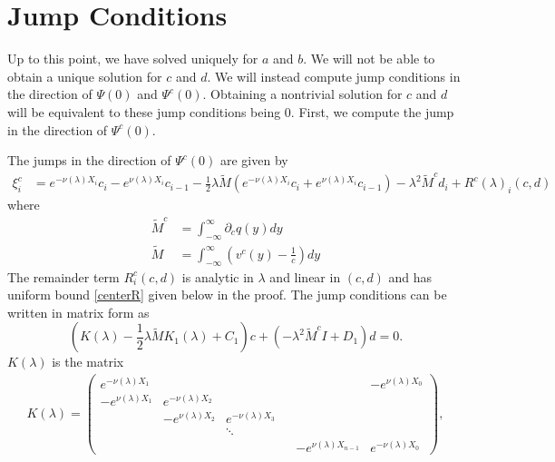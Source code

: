 \documentclass[thesis.tex]{subfiles}
\begin{document}
\section{Jump Conditions}

Up to this point, we have solved uniquely for $a$ and $b$. We will not be able to obtain a unique solution for $c$ and $d$. We will instead compute jump conditions in the direction of $\Psi(0)$ and $\Psi^c(0)$. Obtaining a nontrivial solution for $c$ and $d$ will be equivalent to these jump conditions being 0. First, we compute the jump in the direction of $\Psi^c(0)$. 

\begin{lemma}\label{jumpcenteradj}
The jumps in the direction of $\Psi^c(0)$ are given by
\begin{equation}\label{xic}
\begin{aligned}
\xi^c_i &= e^{-\nu(\lambda)X_i} c_i - e^{\nu(\lambda)X_i} c_{i-1} - \frac{1}{2}\lambda \tilde{M} \left( e^{-\nu(\lambda)X_i}c_i + e^{\nu(\lambda)X_i}c_{i-1}\right) - \lambda^2 \tilde{M}^c d_i + R^c(\lambda)_i(c, d)
\end{aligned}
\end{equation}
where
\begin{align*}
\tilde{M}^c &= \int_{-\infty}^\infty \partial_c q(y) dy \\
\tilde{M} &= \int_{-\infty}^{\infty} \left(v^c(y) - \frac{1}{c}\right) dy
\end{align*}
The remainder term $R^c_i(c, d)$ is analytic in $\lambda$ and linear in $(c, d)$ and has uniform bound \cref{centerR} given below in the proof. The jump conditions can be written in matrix form as
\begin{equation}\label{matrixjumpc}
\left( K(\lambda) -\frac{1}{2} \lambda \tilde{M} K_1(\lambda) + C_1 \right) c + (-\lambda^2 \tilde{M}^c I + D_1) d = 0.
\end{equation}
$K(\lambda)$ is the matrix
\begin{align*}
K(\lambda) =  
\begin{pmatrix}
e^{-\nu(\lambda)X_1} & & & & & -e^{\nu(\lambda)X_0} \\
-e^{\nu(\lambda)X_1} & e^{-\nu(\lambda)X_2} \\
& -e^{\nu(\lambda)X_2} & e^{-\nu(\lambda)X_3} \\
  & & \ddots & && \\
& & & & -e^{\nu(\lambda)X_{n-1}} & e^{-\nu(\lambda)X_0}
\end{pmatrix},
\end{align*}

\end{lemma}
\end{document}

